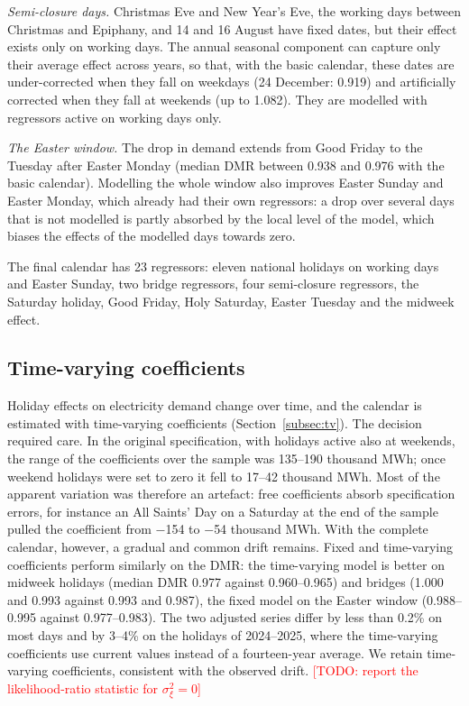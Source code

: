 \documentclass[Afour, times]{sagej}
\newcommand{\m}{$-$}
\newcommand{\todo}[1]{\textcolor{red}{[TODO: #1]}}
\begin{document}
\textit{Semi-closure days.} Christmas Eve and New Year's Eve, the working days between Christmas and Epiphany, and 14 and 16 August have fixed dates, but their effect exists only on working days. The annual seasonal component can capture only their average effect across years, so that, with the basic calendar, these dates are under-corrected when they fall on weekdays (24 December: 0.919) and artificially corrected when they fall at weekends (up to 1.082). They are modelled with regressors active on working days only.

\textit{The Easter window.} The drop in demand extends from Good Friday to the Tuesday after Easter Monday (median DMR between 0.938 and 0.976 with the basic calendar). Modelling the whole window also improves Easter Sunday and Easter Monday, which already had their own regressors: a drop over several days that is not modelled is partly absorbed by the local level of the model, which biases the effects of the modelled days towards zero.

The final calendar has 23 regressors: eleven national holidays on working days and Easter Sunday, two bridge regressors, four semi-closure regressors, the Saturday holiday, Good Friday, Holy Saturday, Easter Tuesday and the midweek effect.

\subsection{Time-varying coefficients}

Holiday effects on electricity demand change over time, and the calendar is estimated with time-varying coefficients (Section~\ref{subsec:tv}). The decision required care. In the original specification, with holidays active also at weekends, the range of the coefficients over the sample was 135--190 thousand MWh; once weekend holidays were set to zero it fell to 17--42 thousand MWh. Most of the apparent variation was therefore an artefact: free coefficients absorb specification errors, for instance an All Saints' Day on a Saturday at the end of the sample pulled the coefficient from \m154 to \m54 thousand MWh. With the complete calendar, however, a gradual and common drift remains. Fixed and time-varying coefficients perform similarly on the DMR: the time-varying model is better on midweek holidays (median DMR 0.977 against 0.960--0.965) and bridges (1.000 and 0.993 against 0.993 and 0.987), the fixed model on the Easter window (0.988--0.995 against 0.977--0.983). The two adjusted series differ by less than 0.2\% on most days and by 3--4\% on the holidays of 2024--2025, where the time-varying coefficients use current values instead of a fourteen-year average. We retain time-varying coefficients, consistent with the observed drift. \todo{report the likelihood-ratio statistic for $\sigma^2_\xi = 0$}
\end{document}
